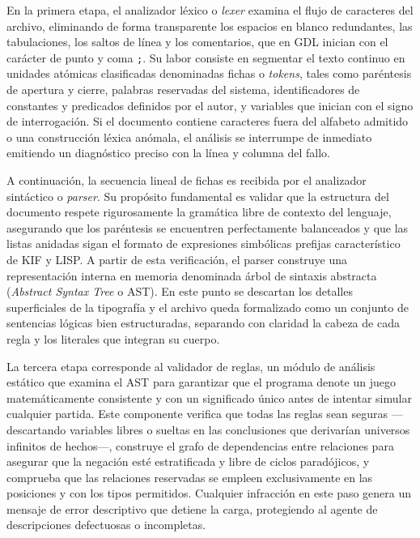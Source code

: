 En la primera etapa, el analizador léxico o \emph{lexer} examina el flujo de caracteres del archivo, eliminando de forma transparente los espacios en blanco redundantes, las tabulaciones, los saltos de línea y los comentarios, que en GDL inician con el carácter de punto y coma \texttt{;}. Su labor consiste en segmentar el texto continuo en unidades atómicas clasificadas denominadas fichas o \emph{tokens}, tales como paréntesis de apertura y cierre, palabras reservadas del sistema, identificadores de constantes y predicados definidos por el autor, y variables que inician con el signo de interrogación. Si el documento contiene caracteres fuera del alfabeto admitido o una construcción léxica anómala, el análisis se interrumpe de inmediato emitiendo un diagnóstico preciso con la línea y columna del fallo.

A continuación, la secuencia lineal de fichas es recibida por el analizador sintáctico o \emph{parser}. Su propósito fundamental es validar que la estructura del documento respete rigurosamente la gramática libre de contexto del lenguaje, asegurando que los paréntesis se encuentren perfectamente balanceados y que las listas anidadas sigan el formato de expresiones simbólicas prefijas característico de KIF y LISP. A partir de esta verificación, el parser construye una representación interna en memoria denominada árbol de sintaxis abstracta (\emph{Abstract Syntax Tree} o AST). En este punto se descartan los detalles superficiales de la tipografía y el archivo queda formalizado como un conjunto de sentencias lógicas bien estructuradas, separando con claridad la cabeza de cada regla y los literales que integran su cuerpo.

La tercera etapa corresponde al validador de reglas, un módulo de análisis estático que examina el AST para garantizar que el programa denote un juego matemáticamente consistente y con un significado único antes de intentar simular cualquier partida. Este componente verifica que todas las reglas sean seguras —descartando variables libres o sueltas en las conclusiones que derivarían universos infinitos de hechos—, construye el grafo de dependencias entre relaciones para asegurar que la negación esté estratificada y libre de ciclos paradójicos, y comprueba que las relaciones reservadas se empleen exclusivamente en las posiciones y con los tipos permitidos. Cualquier infracción en este paso genera un mensaje de error descriptivo que detiene la carga, protegiendo al agente de descripciones defectuosas o incompletas.

